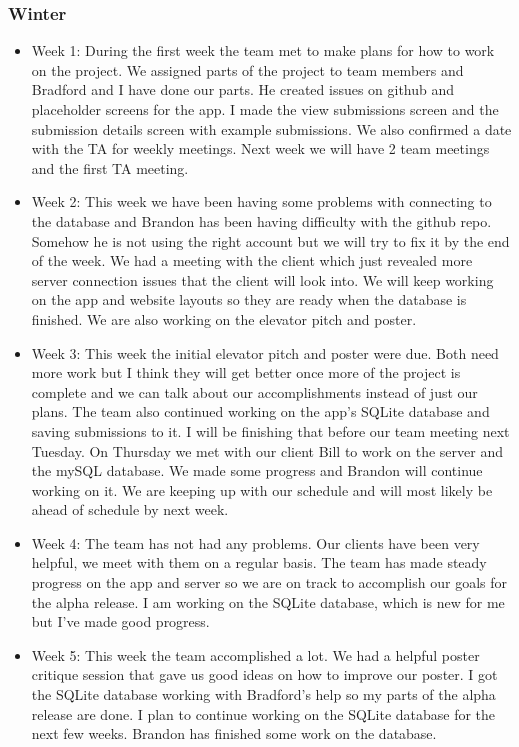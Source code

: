 \documentclass[onecolumn, draftclsnofoot,10pt, compsoc]{IEEEtran}
\begin{document}
 \subsubsection{Winter}
 \begin{itemize}
     \item Week 1: During the first week the team met to make plans for how to work on the project. We assigned parts of the project to team members and Bradford and I have done our parts. He created issues on github and placeholder screens for the app. I made the view submissions screen and the submission details screen with example submissions. We also confirmed a date with the TA for weekly meetings. Next week we will have 2 team meetings and the first TA meeting. 
     \item Week 2: This week we have been having some problems with connecting to the database and Brandon has been having difficulty with the github repo. Somehow he is not using the right account but we will try to fix it by the end of the week. We had a meeting with the client which just revealed more server connection issues that the client will look into. We will keep working on the app and website layouts so they are ready when the database is finished. We are also working on the elevator pitch and poster. 
     \item Week 3: This week the initial elevator pitch and poster were due. Both need more work but I think they will get better once more of the project is complete and we can talk about our accomplishments instead of just our plans. The team also continued working on the app's SQLite database and saving submissions to it. I will be finishing that before our team meeting next Tuesday. On Thursday we met with our client Bill to work on the server and the mySQL database. We made some progress and Brandon will continue working on it. We are keeping up with our schedule and will most likely be ahead of schedule by next week. 
     \item Week 4: The team has not had any problems. Our clients have been very helpful, we meet with them on a regular basis. The team has made steady progress on the app and server so we are on track to accomplish our goals for the alpha release. I am working on the SQLite database, which is new for me but I've made good progress. 
     \item Week 5: This week the team accomplished a lot. We had a helpful poster critique session that gave us good ideas on how to improve our poster. I got the SQLite database working with Bradford's help so my parts of the alpha release are done. I plan to continue working on the SQLite database for the next few weeks. Brandon has finished some work on the database. 

\end{itemize}
\end{document}
